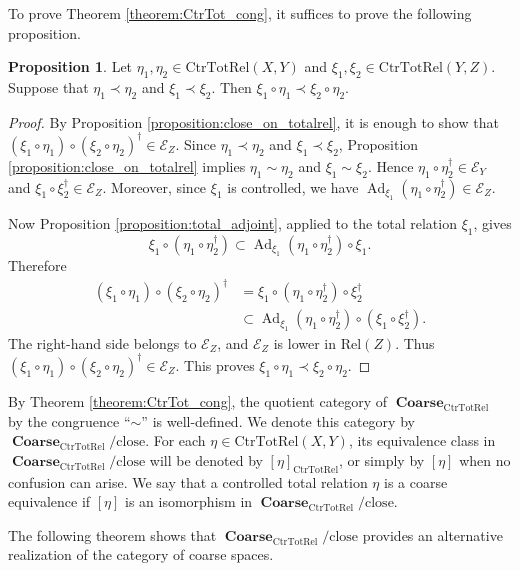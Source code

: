 \documentclass[12pt, a4paper]{amsart}
\theoremstyle{definition}
\newtheorem{proposition}[theorem]{Proposition}
\newcommand{\Ad}{\mathop{\mathrm{Ad}}\nolimits}
\newcommand{\Coarse}{\mathop{\mathbf{Coarse}}\nolimits}
\newcommand{\Rel}{\mathrm{Rel}}
\newcommand{\CtrTotRel}{\mathrm{CtrTotRel}}
\newcommand{\close}{\mathrm{close}}
\begin{document}
To prove Theorem \ref{theorem:CtrTot_cong}, it suffices to prove the following proposition.

\begin{proposition}\label{proposition:composition_close_total}
Let $\eta_1,\eta_2\in\CtrTotRel(X,Y)$ and
$\xi_1,\xi_2\in\CtrTotRel(Y,Z)$.
Suppose that $\eta_1\prec\eta_2$ and $\xi_1\prec\xi_2$.
Then
$\xi_1\circ\eta_1\prec\xi_2\circ\eta_2$.
\end{proposition}

\begin{proof}
By Proposition \ref{proposition:close_on_totalrel}, it is enough to show that
$(\xi_1\circ\eta_1)\circ(\xi_2\circ\eta_2)^\dagger\in\mathcal{E}_Z$.
Since $\eta_1\prec\eta_2$ and $\xi_1\prec\xi_2$, Proposition
\ref{proposition:close_on_totalrel} implies
$\eta_1\sim\eta_2$ and $\xi_1\sim\xi_2$.
Hence
$\eta_1\circ\eta_2^\dagger\in\mathcal{E}_Y$ and
$\xi_1\circ\xi_2^\dagger\in\mathcal{E}_Z$.
Moreover, since $\xi_1$ is controlled, we have
$\Ad_{\xi_1}(\eta_1\circ\eta_2^\dagger)\in\mathcal{E}_Z$.

Now Proposition \ref{proposition:total_adjoint}, applied to the total
relation $\xi_1$, gives
\[
\xi_1\circ(\eta_1\circ\eta_2^\dagger)
\subset
\Ad_{\xi_1}(\eta_1\circ\eta_2^\dagger)\circ\xi_1.
\]
Therefore
\begin{align*}
(\xi_1\circ\eta_1)\circ(\xi_2\circ\eta_2)^\dagger
&=
\xi_1\circ(\eta_1\circ\eta_2^\dagger)\circ\xi_2^\dagger \\
&\subset
\Ad_{\xi_1}(\eta_1\circ\eta_2^\dagger)
\circ
(\xi_1\circ\xi_2^\dagger).
\end{align*}
The right-hand side belongs to $\mathcal{E}_Z$, and $\mathcal{E}_Z$ is lower
in $\Rel(Z)$.
Thus
$(\xi_1\circ\eta_1)\circ(\xi_2\circ\eta_2)^\dagger\in\mathcal{E}_Z$.
This proves
$\xi_1\circ\eta_1\prec\xi_2\circ\eta_2$.
\end{proof}

By Theorem \ref{theorem:CtrTot_cong}, the quotient category of
$\Coarse_{\CtrTotRel}$ by the congruence ``$\sim$'' is well-defined.
We denote this category by
$\Coarse_{\CtrTotRel}/{\close}$.
For each
$\eta\in\CtrTotRel(X,Y)$,
its equivalence class in
$\Coarse_{\CtrTotRel}/{\close}$
will be denoted by
$[\eta]_{\CtrTotRel}$,
or simply by $[\eta]$ when no confusion can arise.
We say that a controlled total relation $\eta$ is a coarse equivalence if $[\eta]$ is an isomorphism in $\Coarse_{\CtrTotRel}/{\close}$.

The following theorem shows that
$\Coarse_{\CtrTotRel}/{\close}$
provides an alternative realization of the category of coarse spaces.
\end{document}
